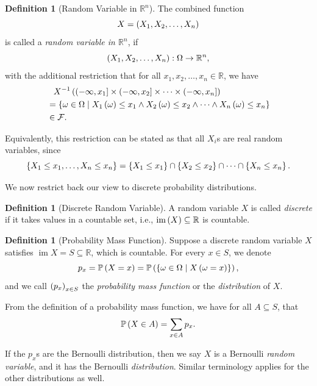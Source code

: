 \documentclass{article}
\theoremstyle{definition}
\newtheorem{definition}[theorem]{Definition}
\theoremstyle{remark}
\newcommand{\RR}{\mathbb{R}}
\newcommand{\Prob}{\mathbb{P}}
\newcommand{\eventSpace}{\mathcal{F}}
\newcommand{\inverse}{^{-1}}
\newcommand{\ocintv}[2]{(#1,#2]}
\newcommand{\set}[2]{\{#1\mid #2\}}
\newcommand{\functiondomain}[3]{#1:#2\to #3}
\newcommand{\img}{\operatorname{im}}
\begin{document}
\begin{definition}[Random Variable in \(\RR^n\)]
    \label{def:random-variable-rn}%
    The combined function
    \[
        X = \left(X_1, X_2, \ldots, X_n\right)
    \]
    is called a \emph{random variable in \(\RR^n\)}, if
    \[
        \functiondomain{\pqty{X_1, X_2, \ldots, X_n}}{\Omega}{\RR^n},
    \]
    with the additional restriction that for all \(x_1, x_2, \ldots, x_n \in \RR\), we have
    \begin{align*}
        &\phantom{=} X\inverse\pqty{\ocintv{-\infty}{x_1} \times \ocintv{-\infty}{x_2} \times \cdots \times \ocintv{-\infty}{x_n}} \\
        &= \set{\omega \in \Omega}{X_1 \pqty{\omega} \leq x_1 \land X_2 \pqty{\omega} \leq x_2 \land \cdots \land X_n \pqty{\omega} \leq x_n} \\
        &\in \eventSpace.
    \end{align*}

    Equivalently, this restriction can be stated as that all \(X_i\)s are real random variables, since
    \[
        \left\{X_1 \leq x_1, \ldots, X_n \leq x_n\right\} = \left\{X_1 \leq x_1\right\} \cap \left\{X_2 \leq x_2\right\} \cap \cdots \cap \left\{X_n \leq x_n\right\}.
    \]
\end{definition}

We now restrict back our view to discrete probability distributions.

\begin{definition}[Discrete Random Variable]
    \label{def:discrete-random-variable}%
    A random variable \(X\) is called \emph{discrete} if it takes values in a countable set, i.e., \(\img \pqty{X} \subseteq \RR\) is countable.
\end{definition}

\begin{definition}[Probability Mass Function]
    \label{def:probability-mass-function}%
    Suppose a discrete random variable \(X\) satisfies \(\img X = S \subseteq \RR\), which is countable. For every \(x \in S\), we denote
    \[
        p_x = \Prob\pqty{X = x} = \Prob\pqty{\set{\omega \in \Omega}{X\pqty{\omega = x}}},
    \]
    and we call \(\left(p_x\right)_{x \in S}\) the \emph{probability mass function} or the \emph{distribution} of \(X\).
\end{definition}

From the definition of a probability mass function, we have for all \(A \subseteq S\), that
\[
    \Prob\pqty{X \in A} = \sum_{x \in A} p_x.
\]

If the \(p_x\)s are the Bernoulli distribution, then we say \(X\) is a Bernoulli \emph{random variable}, and it has the Bernoulli \emph{distribution}. Similar terminology applies for the other distributions as well.
\end{document}
